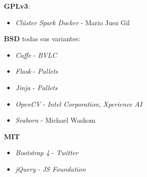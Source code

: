 \textbf{GPLv3}:
\begin{itemize}
	\item \textit{Clúster Spark Docker} - Mario Juez Gil
\end{itemize}

\textbf{BSD} todas sus variantes:
\begin{itemize}
	\item \textit{Caffe} - \textit{BVLC}
	\item \textit{Flask} - \textit{Pallets}
	\item \textit{Jinja} - \textit{Pallets}
	\item \textit{OpenCV} - \textit{Intel Corporation}, \textit{Xperience AI}
	\item \textit{Seaborn} - Michael Waskom
\end{itemize}

\textbf{MIT}
\begin{itemize}
	\item \textit{Bootstrap 4} - \textit{Twitter}
	\item \textit{jQuery} - \textit{JS Foundation}
\end{itemize}

